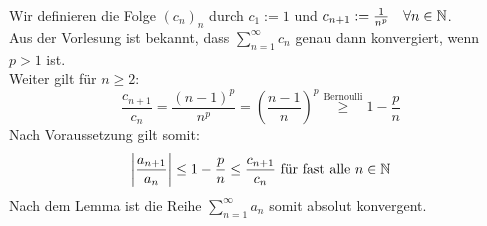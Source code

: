 \documentclass[../ana1u.tex]{subfiles}
\begin{document}
\begin{bew}
    Wir definieren die Folge \((c_n)_n\) durch \(c_1 := 1\) und \(c_{n+1} := \frac{1}{n^p} \quad \forall n \in \mathbb{N}\).\\
    Aus der Vorlesung ist bekannt, dass \(\sum_{n=1}^{\infty} c_n\) genau dann konvergiert, wenn \(p > 1\) ist.\\
    Weiter gilt für \(n \geq 2\):
    \[\frac{c_{n+1}}{c_n} = \frac{(n-1)^p}{n^p} = \left(\frac{n-1}{n}\right)^p \overset{\text{Bernoulli}}{\geq} 1 - \frac{p}{n}\]
    Nach Voraussetzung gilt somit:
    \[\left|\frac{a_{n+1}}{a_n}\right| \leq 1 - \frac{p}{n} \leq \frac{c_{n+1}}{c_n} \text{ für fast alle } n \in \mathbb{N}\]
    Nach dem Lemma ist die Reihe \(\sum_{n=1}^{\infty} a_n\) somit absolut konvergent.
\end{bew}
\end{document}

